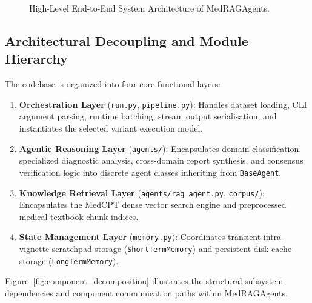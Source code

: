 \begin{figure}[htbp]
{%
}
\caption{High-Level End-to-End System Architecture of MedRAGAgents.}
\label{fig:system_architecture}
\end{figure}

\subsection{Architectural Decoupling and Module Hierarchy}

The codebase is organized into four core functional layers:

\begin{enumerate}
    \item \textbf{Orchestration Layer} (\texttt{run.py}, \texttt{pipeline.py}): Handles dataset loading, CLI argument parsing, runtime batching, stream output serialisation, and instantiates the selected variant execution model.
    \item \textbf{Agentic Reasoning Layer} (\texttt{agents/}): Encapsulates domain classification, specialized diagnostic analysis, cross-domain report synthesis, and consensus verification logic into discrete agent classes inheriting from \texttt{BaseAgent}.
    \item \textbf{Knowledge Retrieval Layer} (\texttt{agents/rag\_agent.py}, \texttt{corpus/}): Encapsulates the MedCPT dense vector search engine and preprocessed medical textbook chunk indices.
    \item \textbf{State Management Layer} (\texttt{memory.py}): Coordinates transient intra-vignette scratchpad storage (\texttt{ShortTermMemory}) and persistent disk cache storage (\texttt{LongTermMemory}).
\end{enumerate}

Figure~\ref{fig:component_decomposition} illustrates the structural subsystem dependencies and component communication paths within MedRAGAgents.

